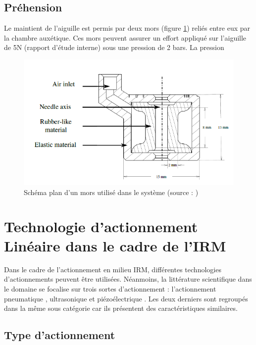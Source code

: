 \documentclass[10pt, a4paper]{article}
\begin{document}
    \subsection{Préhension}
        \qquad Le maintient de l'aiguille est permis par deux mors (figure \ref{fig:mors}) reliés entre eux par la chambre auxétique. Ces mors peuvent assurer un effort appliqué sur l'aiguille de 5N (rapport d'étude interne) sous une pression de 2 bars. La pression
        
\begin{figure}[ht!]
\centering
\includegraphics[scale=0.5]{ImageIntro/mors.PNG}
\caption{ Schéma plan d'un mors utilisé dans le système (source : \cite{Pfeil2018})}
\label{fig:mors}
\end{figure} 

\section{Technologie d'actionnement Linéaire dans le cadre de l'IRM}

    \qquad Dans le cadre de l'actionnement en milieu IRM, différentes technologies d'actionnements peuvent être utilisées. Néanmoins, la littérature scientifique dans le domaine \cite{Fischer2008} se focalise sur trois sortes d'actionnement : l'actionnement pneumatique \cite{Pfeil2018}\cite{Fischer2008a}, ultrasonique \cite{Masamune1995} et piézoélectrique \cite{Wang2009}\cite{Su2015}\cite{Su2012}. Les deux derniers sont regroupés dans la même sous catégorie car ils présentent des caractéristiques similaires.
    
    \subsection{Type d'actionnement}
\end{document}
